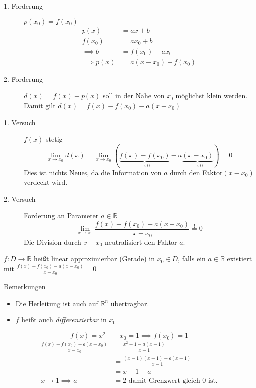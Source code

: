 \begin{description}
	\item[1. Forderung] \( p(x_0)=f(x_0) \) 
	\begin{align*}
			p(x) &= ax+b \\
			f(x_0) &= ax_0+b \\
			\implies b &= f(x_0)-ax_0 \\
			\implies p(x) &= a(x-x_0)+f(x_0)
	\end{align*}
	\item[2. Forderung] \( d(x)=f(x)-p(x) \) soll in der Nähe von \( x_0 \) möglichst klein werden. Damit gilt \( d(x) = f(x) -f(x_0)-a(x-x_0) \)
	\item[1. Versuch] \( f(x) \) stetig  
	\[\lim_{x\rightarrow x_0} d(x)=\lim_{x\rightarrow x_0}(\underbrace{f(x)-f(x_0)}_{\rightarrow 0}-a\underbrace{(x-x_0)}_{\rightarrow 0})=0\]Dies ist nichts Neues, da die Information von \( a \) durch den Faktor\( (x-x_0) \) verdeckt wird.
	\item[2. Versuch] Forderung an Parameter \( a \in \mathbb{R} \)
	\[
		\lim_{x\rightarrow x_0}\frac{f(x)-f(x_0)-a(x-x_0)}{x-x_0}\stackrel{!}{=}0
	\]
	Die Division durch \( x-x_0 \) neutralisiert den Faktor \( a \).
\end{description}

\begin{definition}
	\( f:D \rightarrow \mathbb{R} \) heißt linear approximierbar (Gerade) in \( x_0 \in D \), falls ein \( a \in \mathbb{R} \) existiert mit \( \frac{f(x)-f(x_0)-a(x-x_0)}{x-x_0}=0 \)
\end{definition}
\noindent Bemerkungen

\begin{itemize}
	\item Die Herleitung ist auch auf \( \mathbb{R}^n \) übertragbar.
	\item \( f \) heißt auch \emph{differenzierbar} in \( x_0 \)
\end{itemize}
\begin{example} 
\[
f(x)=x^2 \qquad x_0=1 \implies f(x_0)=1
\]
\begin{align*}
	\frac{f(x)-f(x_0)-a(x-x_0)}{x-x_0} &= \frac{x^2-1-a(x-1)}{x-1} \\ &= \frac{(x-1)(x+1)-a(x-1)}{x-1} \\&= x+1-a \qquad \\ x \rightarrow 1 \implies a&=2 \text{ damit Grenzwert gleich }0\text{ ist.}
\end{align*}
\end{example}
	

